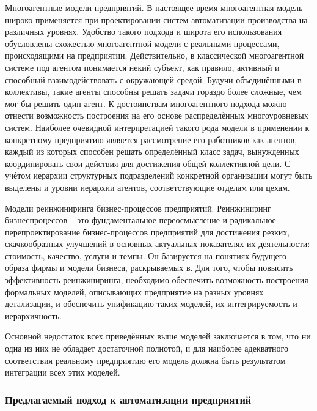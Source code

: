 \begin{textitemize}
    \item Многоагентные модели предприятий. В настоящее время многоагентная модель широко применяется при проектировании систем автоматизации производства на различных уровнях. Удобство такого подхода и широта его использования обусловлены схожестью многоагентной модели с реальными процессами, происходящими на предприятии. Действительно, в классической многоагентной системе под агентом понимается некий субъект, как правило, активный и способный взаимодействовать с окружающей средой. Будучи объединёнными в коллективы, такие агенты способны решать задачи гораздо более сложные, чем мог бы решить один агент. К достоинствам многоагентного подхода можно отнести возможность построения на его основе распределѐнных многоуровневых систем. Наиболее очевидной интерпретацией такого рода модели в применении к конкретному предприятию является рассмотрение его работников как агентов, каждый из которых способен решать определённый класс задач, вынужденных координировать свои действия для достижения общей коллективной цели. С учѐтом иерархии структурных подразделений конкретной организации могут быть выделены и уровни иерархии агентов, соответствующие отделам или цехам.
    \item Модели реинжиниринга бизнес-процессов предприятий. Реинжиниринг бизнеспроцессов – это фундаментальное переосмысление и радикальное перепроектирование бизнес-процессов предприятий для достижения резких, скачкообразных улучшений в основных актуальных показателях их деятельности: стоимость, качество, услуги и темпы. Он базируется на понятиях будущего образа фирмы и модели бизнеса, раскрываемых в. Для того, чтобы повысить эффективность реинжиниринга, необходимо обеспечить возможность построения формальных моделей, описывающих предприятие на разных уровнях детализации, и обеспечить унификацию таких моделей, их интегрируемость и иерархичность.
\end{textitemize}

Основной недостаток всех приведённых выше моделей заключается в том, что ни одна из них не обладает достаточной полнотой, и для наиболее адекватного соответствия реальному предприятию его модель должна быть результатом интеграции всех этих моделей.

\subsubsection{Предлагаемый подход к автоматизации предприятий}
\label{sec_chapter_enterprise_automation_proposed_approach}



